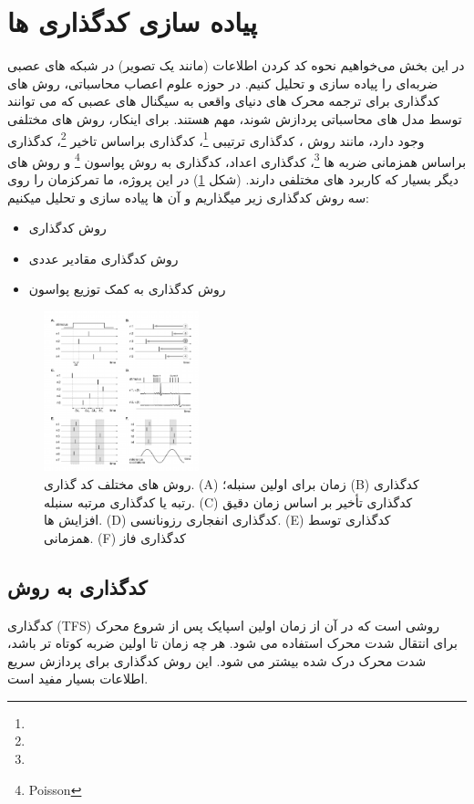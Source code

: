 
\newpage
\section{پیاده سازی کدگذاری ها}
    در این بخش می‌خواهیم نحوه کد کردن اطلاعات
    (مانند یک تصویر) 
    در شبکه های عصبی ضربه‌ای را پیاده سازی و تحلیل کنیم.
    در حوزه علوم اعصاب محاسباتی، روش های کدگذاری برای ترجمه محرک های دنیای واقعی به سیگنال های عصبی که می توانند توسط مدل های محاسباتی پردازش شوند، مهم هستند.
    برای اینکار، روش های مختلفی وجود دارد، مانند روش 
    ، 
    کدگذاری ترتیبی
    \footnote{}، 
    کدگذاری براساس تاخیر
    \footnote{}، 
    کدگذاری براساس همزمانی ضربه ها
    \footnote{}، 
    کدگذاری اعداد، کدگذاری به روش پواسون
    \footnote{Poisson} 
    و روش های دیگر بسیار که کاربرد های مختلفی دارند.
    (شکل \ref{fig:encoders})
    در این پروژه، ما تمرکزمان را روی سه روش کدگذاری زیر میگذاریم و آن ها پیاده سازی و تحلیل میکنیم:
    \begin{itemize}
        \item روش کدگذاری 
        \item روش کدگذاری مقادیر عددی
        \item روش کدگذاری به کمک توزیع پواسون
    \end{itemize}

    \begin{figure}[!ht]
        \centering
        \includegraphics[width=0.4\textwidth]{images/encoders.png} 
        \caption{روش های مختلف کد گذاری. 
        (A) زمان برای اولین سنبله؛ (B) کدگذاری رتبه یا کدگذاری مرتبه سنبله. (C) کدگذاری تأخیر بر اساس زمان دقیق افزایش ها. (D) کدگذاری انفجاری رزونانسی. (E) کدگذاری توسط همزمانی. (F) کدگذاری فاز}
        \label{fig:encoders}
    \end{figure}
    \subsection{کدگذاری به روش 
    }
        کدگذاری 
         (TFS)
        روشی است که در آن از زمان اولین اسپایک پس از شروع محرک برای انتقال شدت محرک استفاده می شود. هر چه زمان تا اولین ضربه کوتاه تر باشد، شدت محرک درک شده بیشتر می شود. این روش کدگذاری برای پردازش سریع اطلاعات بسیار مفید است.


